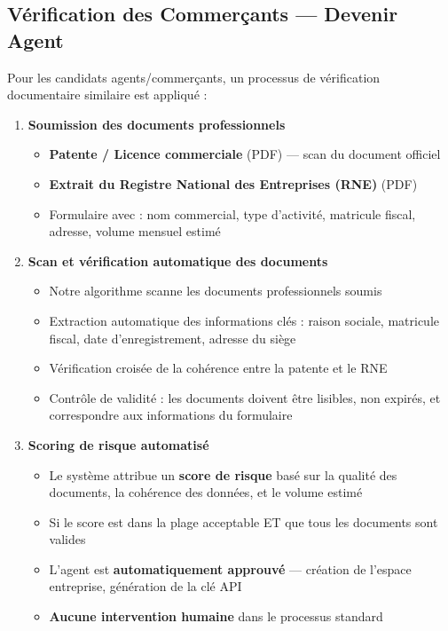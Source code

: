 \documentclass[11pt,a4paper]{article}
\begin{document}
\subsection{V\'erification des Commer\c{c}ants --- Devenir Agent}

Pour les candidats agents/commer\c{c}ants, un processus de v\'erification documentaire similaire est appliqu\'e :

\begin{enumerate}[leftmargin=*]
    \item \textbf{Soumission des documents professionnels}
    \begin{itemize}
        \item \textbf{Patente / Licence commerciale} (PDF) --- scan du document officiel
        \item \textbf{Extrait du Registre National des Entreprises (RNE)} (PDF)
        \item Formulaire avec : nom commercial, type d'activit\'e, matricule fiscal, adresse, volume mensuel estim\'e
    \end{itemize}

    \item \textbf{Scan et v\'erification automatique des documents}
    \begin{itemize}
        \item Notre algorithme scanne les documents professionnels soumis
        \item Extraction automatique des informations cl\'es : raison sociale, matricule fiscal, date d'enregistrement, adresse du si\`ege
        \item V\'erification crois\'ee de la coh\'erence entre la patente et le RNE
        \item Contr\^ole de validit\'e : les documents doivent \^etre lisibles, non expir\'es, et correspondre aux informations du formulaire
    \end{itemize}

    \item \textbf{Scoring de risque automatis\'e}
    \begin{itemize}
        \item Le syst\`eme attribue un \textbf{score de risque} bas\'e sur la qualit\'e des documents, la coh\'erence des donn\'ees, et le volume estim\'e
        \item Si le score est dans la plage acceptable ET que tous les documents sont valides
        \item L'agent est \textbf{automatiquement approuv\'e} --- cr\'eation de l'espace entreprise, g\'en\'eration de la cl\'e API
        \item \textbf{Aucune intervention humaine} dans le processus standard
    \end{itemize}


\end{enumerate}
\end{document}
